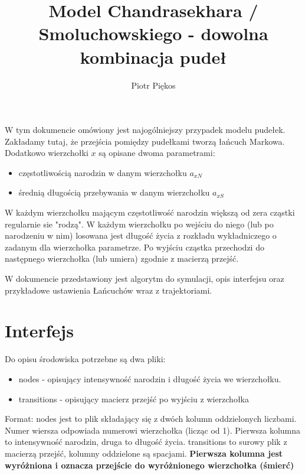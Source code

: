 \documentclass{article}
\begin{document}
\title{Model Chandrasekhara / Smoluchowskiego  - dowolna kombinacja pudeł}
\author{Piotr Piękos}

\maketitle

W tym dokumencie omówiony jest najogólniejszy przypadek modelu pudełek.
Zakładamy tutaj, że przejścia pomiędzy pudełkami tworzą łańcuch Markowa. Dodatkowo wierzchołki $x$ są opisane dwoma parametrami: \begin{itemize}
\item częstotliwością narodzin w danym wierzchołku $a_{xN}$
\item średnią długością przebywania w danym wierzchołku $a_{xS}$
\end{itemize}
W każdym wierzchołku mającym częstotliwość narodzin większą od zera cząstki regularnie sie "rodzą". W każdym wierzchołku po wejściu do niego (lub po narodzeniu w nim) losowana jest długość życia z rozkładu wykładniczego o zadanym dla wierzchołka parametrze. Po wyjściu cząstka przechodzi do następnego wierzchołka (lub umiera) zgodnie z macierzą przejść.

W dokumencie przedstawiony jest algorytm do symulacji, opis interfejsu oraz przykładowe ustawienia Łańcuchów wraz z trajektoriami.

\section{Interfejs}
Do opisu środowiska potrzebne są dwa pliki: \begin{itemize}
\item nodes - opisujący intensywność narodzin i długość życia we wierzchołku.
\item transitions - opisujący macierz przejść po wyjściu z wierzchołka
\end{itemize}

Format: \newline nodes jest to plik składający się z dwóch kolumn oddzielonych liczbami. Numer wiersza odpowiada numerowi wierzchołka (licząc od 1). Pierwsza kolumna to intensywność narodzin, druga to długość życia. \newline
transitions to surowy plik z macierzą przejść, kolumny oddzielone są spacjami. \textbf{ Pierwsza kolumna jest wyróżniona i oznacza przejście do wyróżnionego wierzchołka (śmierć)} 
\end{document}
